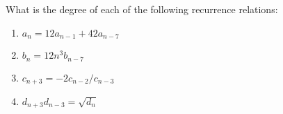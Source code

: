What is the degree of each of the following recurrence relations:
\begin{enumerate}[nosep,label=(\alph*)]
\item $a_n = 12 a_{n - 1} + 42 a_{n - 7}$
\item $b_n = 12 n^3 b_{n - 7}$
\item $c_{n+3} = -2 c_{n - 2}/c_{n - 3}$
\item $d_{n+3}d_{n-3} = \sqrt{d_n}$
\end{enumerate}
